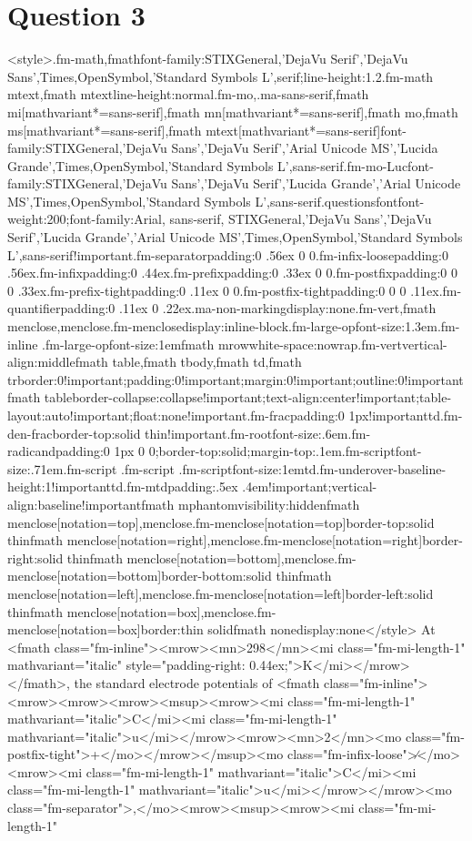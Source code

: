 \documentclass{article}
\begin{document}
\section*{Question 3}
<style>.fm-math,fmath{font-family:STIXGeneral,'DejaVu Serif','DejaVu Sans',Times,OpenSymbol,'Standard Symbols L',serif;line-height:1.2}.fm-math mtext,fmath mtext{line-height:normal}.fm-mo,.ma-sans-serif,fmath mi[mathvariant*=sans-serif],fmath mn[mathvariant*=sans-serif],fmath mo,fmath ms[mathvariant*=sans-serif],fmath mtext[mathvariant*=sans-serif]{font-family:STIXGeneral,'DejaVu Sans','DejaVu Serif','Arial Unicode MS','Lucida Grande',Times,OpenSymbol,'Standard Symbols L',sans-serif}.fm-mo-Luc{font-family:STIXGeneral,'DejaVu Sans','DejaVu Serif','Lucida Grande','Arial Unicode MS',Times,OpenSymbol,'Standard Symbols L',sans-serif}.questionsfont{font-weight:200;font-family:Arial, sans-serif, STIXGeneral,'DejaVu Sans','DejaVu Serif','Lucida Grande','Arial Unicode MS',Times,OpenSymbol,'Standard Symbols L',sans-serif!important}.fm-separator{padding:0 .56ex 0 0}.fm-infix-loose{padding:0 .56ex}.fm-infix{padding:0 .44ex}.fm-prefix{padding:0 .33ex 0 0}.fm-postfix{padding:0 0 0 .33ex}.fm-prefix-tight{padding:0 .11ex 0 0}.fm-postfix-tight{padding:0 0 0 .11ex}.fm-quantifier{padding:0 .11ex 0 .22ex}.ma-non-marking{display:none}.fm-vert,fmath menclose,menclose.fm-menclose{display:inline-block}.fm-large-op{font-size:1.3em}.fm-inline .fm-large-op{font-size:1em}fmath mrow{white-space:nowrap}.fm-vert{vertical-align:middle}fmath table,fmath tbody,fmath td,fmath tr{border:0!important;padding:0!important;margin:0!important;outline:0!important}fmath table{border-collapse:collapse!important;text-align:center!important;table-layout:auto!important;float:none!important}.fm-frac{padding:0 1px!important}td.fm-den-frac{border-top:solid thin!important}.fm-root{font-size:.6em}.fm-radicand{padding:0 1px 0 0;border-top:solid;margin-top:.1em}.fm-script{font-size:.71em}.fm-script .fm-script .fm-script{font-size:1em}td.fm-underover-base{line-height:1!important}td.fm-mtd{padding:.5ex .4em!important;vertical-align:baseline!important}fmath mphantom{visibility:hidden}fmath menclose[notation=top],menclose.fm-menclose[notation=top]{border-top:solid thin}fmath menclose[notation=right],menclose.fm-menclose[notation=right]{border-right:solid thin}fmath menclose[notation=bottom],menclose.fm-menclose[notation=bottom]{border-bottom:solid thin}fmath menclose[notation=left],menclose.fm-menclose[notation=left]{border-left:solid thin}fmath menclose[notation=box],menclose.fm-menclose[notation=box]{border:thin solid}fmath none{display:none}</style> At <fmath class="fm-inline"><mrow><mn>298</mn><mi class="fm-mi-length-1" mathvariant="italic" style="padding-right: 0.44ex;">K</mi></mrow></fmath>, the standard electrode potentials of <fmath class="fm-inline"><mrow><mrow><mrow><msup><mrow><mi class="fm-mi-length-1" mathvariant="italic">C</mi><mi class="fm-mi-length-1" mathvariant="italic">u</mi></mrow><mrow><mn>2</mn><mo class="fm-postfix-tight">+</mo></mrow></msup><mo class="fm-infix-loose">∕</mo><mrow><mi class="fm-mi-length-1" mathvariant="italic">C</mi><mi class="fm-mi-length-1" mathvariant="italic">u</mi></mrow></mrow><mo class="fm-separator">,</mo><mrow><msup><mrow><mi class="fm-mi-length-1" 
\end{document}
